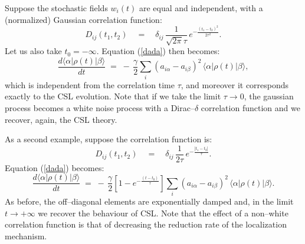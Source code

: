 \documentclass[12pt]{article}
\begin{document}
Suppose the stochastic fields $w_{i}(t)$ are equal and
independent, with a (normalized) Gaussian correlation function:
\begin{equation} \label{gcf}
D_{ij}(t_{1},t_{2}) \quad = \quad \delta_{ij}\,
\frac{1}{\sqrt{2\pi}\tau}\,e^{\displaystyle - \frac{(t_{1} -
t_{2})^{2}}{2\tau^{2}}}.
\end{equation}
Let us also take $t_{0} = -\infty$. Equation (\ref{dada}) then
becomes:
\begin{equation} \label{dadae1}
\frac{d \langle\alpha|\rho(t)|\beta\rangle}{dt} \; = \; - \,
\frac{\gamma}{2} \sum_{i} (a_{i\alpha} - a_{i\beta})^{2} \,
\langle\alpha|\rho(t)|\beta\rangle,
\end{equation}
which is independent from the correlation time $\tau$, and
moreover it corresponds exactly to the CSL evolution. Note that if
we take the limit $\tau \rightarrow 0$, the gaussian process
becomes a white noise process with a Dirac--$\delta$ correlation
function and we recover, again, the CSL theory.

As a second example, suppose the correlation function is:
\begin{equation} \label{gcf2}
D_{ij}(t_{1},t_{2}) \quad = \quad \delta_{ij}\,
\frac{1}{2\tau}\,e^{\displaystyle - \frac{|t_{1} - t_{2}|}{\tau}}.
\end{equation}
Equation (\ref{dada}) becomes:
\begin{equation} \label{dadae2}
\frac{d \langle\alpha|\rho(t)|\beta\rangle}{dt} \; = \; - \,
\frac{\gamma}{2} \left[1- e^{\displaystyle -\frac{(t -
t_{0})}{\tau}}\right] \sum_{i} (a_{i\alpha} - a_{i\beta})^{2} \,
\langle\alpha|\rho(t)|\beta\rangle.
\end{equation}
As before, the off--diagonal elements are exponentially damped
and, in the limit $t \rightarrow +\infty$ we recover the behaviour
of CSL. Note that the effect of a non--white correlation function
is that of decreasing the reduction rate of the localization
mechanism.
\end{document}
